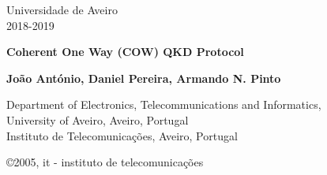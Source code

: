 \documentclass[5pt]{article}
\newcommand{\br}[1]{{\textbf{\color{itred} #1}}}%
\begin{document}
\begin{titlepage}  

\color{itblue} \sffamily \noindent \small
\hspace*{1cm}  Universidade de Aveiro\\ %
\hspace*{1cm}  2018-2019\\ 

\vspace*{1cm}
\begin{center}
    \color{black} \sffamily \noindent \Large
    \br{Coherent One Way (COW) QKD Protocol \\}
\end{center}
\vspace{6mm}
\begin{center}
    \color{black}
    \textbf{João António, Daniel Pereira, Armando N. Pinto\\}
    {}
\end{center}

\vspace{0.0mm}
\scriptsize
\begin{center}
Department of Electronics, Telecommunications and Informatics,\\
University of Aveiro, Aveiro, Portugal\\
Instituto de Telecomunica\c{c}\~{o}es, Aveiro, Portugal\\
\end{center}

\vspace{1.0cm}
\hspace*{13.2cm}\tiny \copyright 2005, it - instituto de telecomunica\c{c}\~{o}es\hfill

\end{titlepage}


\renewcommand{\headsep}{-25pt}

\end{document}

